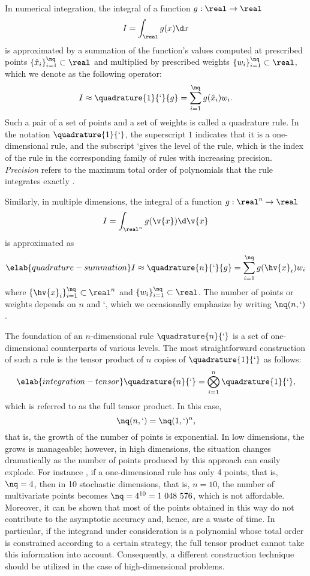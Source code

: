 In numerical integration, the integral of a function $g: \real \to \real$
\[
  I = \int_\real g(x) \d x
\]
is approximated by a summation of the function's values computed at prescribed
points $\{ \hat{x}_i \}_{i = 1}^\nq \subset \real$ and multiplied by prescribed
weights $\{ w_i \}_{i = 1}^\nq \subset \real$, which we denote as the following
operator:
\[
  I \approx \quadrature{1}{\lq}{g} = \sum_{i = 1}^\nq g(\hat{x}_i) w_i.
\]
Such a pair of a set of points and a set of weights is called a quadrature rule.
In the notation $\quadrature{1}{\lq}$, the superscript $1$ indicates that it is
a one-dimensional rule, and the subscript \lq gives the level of the rule, which
is the index of the rule in the corresponding family of rules with increasing
precision. \emph{Precision} refers to the maximum total order of polynomials
that the rule integrates exactly \cite{heiss2008}.

Similarly, in multiple dimensions, the integral of a function $g: \real^n \to
\real$
\[
  I = \int_{\real^n} g(\v{x}) \d \v{x}
\]
is approximated as
\begin{equation} \elab{quadrature-summation}
  I \approx \quadrature{n}{\lq}{g} = \sum_{i = 1}^\nq g(\hv{x}_i) w_i
\end{equation}
where $\{ \hv{x}_i \}_{i = 1}^\nq \subset \real^n$ and $\{ w_i \}_{i = 1}^\nq
\subset \real$. The number of points or weights \nq depends on $n$ and \lq,
which we occasionally emphasize by writing $\nq(n, \lq)$.

The foundation of an $n$-dimensional rule $\quadrature{n}{\lq}$ is a set of
one-dimensional counterparts of various levels. The most straightforward
construction of such a rule is the tensor product of $n$ copies of
$\quadrature{1}{\lq}$ as follows:
\begin{equation} \elab{integration-tensor}
  \quadrature{n}{\lq} = \bigotimes_{i = 1}^n \quadrature{1}{\lq},
\end{equation}
which is referred to as the full tensor product. In this case,
\[
  \nq(n, \lq) = \nq(1, \lq)^n,
\]
that is, the growth of the number of points is exponential. In low dimensions,
the grows is manageable; however, in high dimensions, the situation changes
dramatically as the number of points produced by this approach can easily
explode. For instance \cite{heiss2008}, if a one-dimensional rule has only 4
points, that is, $\nq = 4$, then in 10 stochastic dimensions, that is, $n = 10$,
the number of multivariate points becomes $\nq = 4^{10} = 1~048~576$, which is
not affordable. Moreover, it can be shown that most of the points obtained in
this way do not contribute to the asymptotic accuracy and, hence, are a waste of
time. In particular, if the integrand under consideration is a polynomial whose
total order is constrained according to a certain strategy, the full tensor
product cannot take this information into account. Consequently, a different
construction technique should be utilized in the case of high-dimensional
problems.

